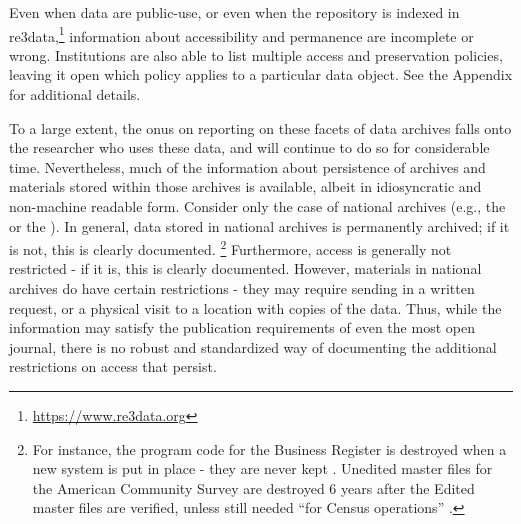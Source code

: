 Even when data are public-use, or even when the repository is indexed in re3data,\footnote{\url{https://www.re3data.org}} information about accessibility and permanence are incomplete or wrong. Institutions are also able to list multiple access and preservation policies, leaving it open which policy applies to a particular data object. See the Appendix for additional details.


To a large extent, the onus on reporting on these facets of data archives falls onto the researcher who uses these data, and will continue to do so for considerable time. 
%
Nevertheless, much of the information about persistence of archives and
materials stored within those archives is available, albeit in
idiosyncratic and non-machine readable form. Consider only the case of
national archives (e.g., the  or the ). 
In general, data stored in national archives is
permanently archived; if it is not, this is clearly documented.%
\footnote{For instance, the program code for the Business Register is destroyed when a new system is put in place - they are never kept \parencite{U.S.CensusBureauRecordsControlSchedule2009}. Unedited master files for the American Community Survey are destroyed 6 years after the Edited master files are verified, unless still needed ``for Census operations'' \parencite{U.S.CensusBureauRecordsControlSchedule1999}.}
Furthermore, access is generally not restricted - if it is, this is
clearly documented. However, materials in national archives do have
certain restrictions - they may require sending in a written request, or
a physical visit to a location with copies of the data. Thus, while the
information may satisfy the publication requirements of even the most
open journal, there is no robust and standardized way of documenting the
additional restrictions on access that persist. 

